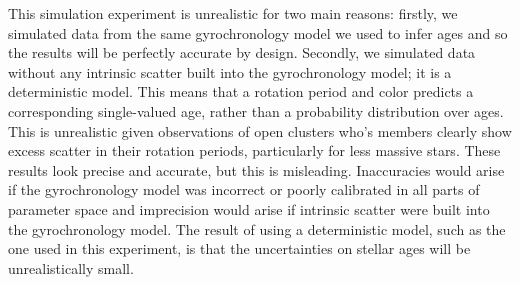 This simulation experiment is unrealistic for two main reasons: firstly, we
simulated data from the same gyrochronology model we used to infer ages and so
the results will be perfectly accurate by design.
Secondly, we simulated data without any intrinsic scatter built into the
gyrochronology model; it is a deterministic model.
This means that a rotation period and color predicts a corresponding
single-valued age, rather than a probability distribution over ages.
This is unrealistic given observations of open clusters who's members clearly
show excess scatter in their rotation periods, particularly for less massive
stars.
These results look precise and accurate, but this is misleading.
Inaccuracies would arise if the gyrochronology model was incorrect or poorly
calibrated in all parts of parameter space and imprecision would arise if
intrinsic scatter were built into the gyrochronology model.
The result of using a deterministic model, such as the one used in this
experiment, is that the uncertainties on stellar ages will be unrealistically
small.


